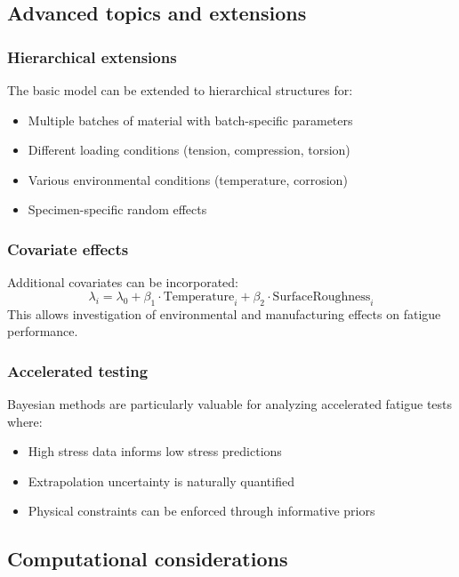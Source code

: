 \subsection{Advanced topics and extensions}

\subsubsection*{Hierarchical extensions}

The basic model can be extended to hierarchical structures for:
\begin{itemize}
\item Multiple batches of material with batch-specific parameters
\item Different loading conditions (tension, compression, torsion)
\item Various environmental conditions (temperature, corrosion)
\item Specimen-specific random effects
\end{itemize}

\subsubsection*{Covariate effects}

Additional covariates can be incorporated:
\begin{equation}
\lambda_i = \lambda_0 + \beta_1 \cdot \text{Temperature}_i + \beta_2 \cdot \text{SurfaceRoughness}_i
\end{equation}
This allows investigation of environmental and manufacturing effects on fatigue performance.

\subsubsection*{Accelerated testing}

Bayesian methods are particularly valuable for analyzing accelerated fatigue tests where:
\begin{itemize}
\item High stress data informs low stress predictions
\item Extrapolation uncertainty is naturally quantified
\item Physical constraints can be enforced through informative priors
\end{itemize}

\subsection{Computational considerations}

